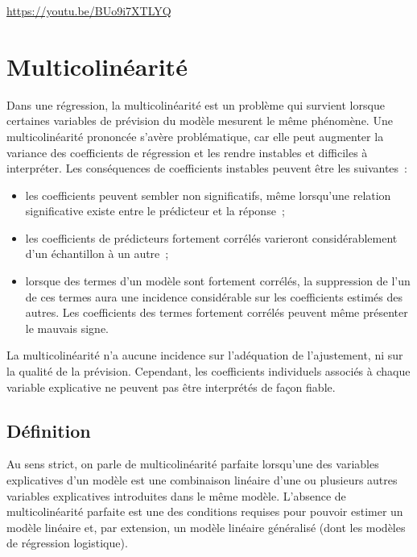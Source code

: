 \documentclass[
  letterpaper,
  DIV=11,
  numbers=noendperiod,
  oneside]{scrreprt}
\providecommand{\tightlist}{%
  \setlength{\itemsep}{0pt}\setlength{\parskip}{0pt}}\usepackage{longtable,booktabs,array}
\begin{document}
\url{https://youtu.be/BUo9i7XTLYQ}

\hypertarget{sec-multicolinearite}{%
\chapter{Multicolinéarité}\label{sec-multicolinearite}}

Dans une régression, la multicolinéarité est un problème qui survient
lorsque certaines variables de prévision du modèle mesurent le même
phénomène. Une multicolinéarité prononcée s'avère problématique, car
elle peut augmenter la variance des coefficients de régression et les
rendre instables et difficiles à interpréter. Les conséquences de
coefficients instables peuvent être les suivantes~:

\begin{itemize}
\tightlist
\item
  les coefficients peuvent sembler non significatifs, même lorsqu'une
  relation significative existe entre le prédicteur et la réponse~;
\item
  les coefficients de prédicteurs fortement corrélés varieront
  considérablement d'un échantillon à un autre~;
\item
  lorsque des termes d'un modèle sont fortement corrélés, la suppression
  de l'un de ces termes aura une incidence considérable sur les
  coefficients estimés des autres. Les coefficients des termes fortement
  corrélés peuvent même présenter le mauvais signe.
\end{itemize}

La multicolinéarité n'a aucune incidence sur l'adéquation de
l'ajustement, ni sur la qualité de la prévision. Cependant, les
coefficients individuels associés à chaque variable explicative ne
peuvent pas être interprétés de façon fiable.

\hypertarget{duxe9finition}{%
\section{Définition}\label{duxe9finition}}

Au sens strict, on parle de multicolinéarité parfaite lorsqu'une des
variables explicatives d'un modèle est une combinaison linéaire d'une ou
plusieurs autres variables explicatives introduites dans le même modèle.
L'absence de multicolinéarité parfaite est une des conditions requises
pour pouvoir estimer un modèle linéaire et, par extension, un modèle
linéaire généralisé (dont les modèles de régression logistique).
\end{document}
